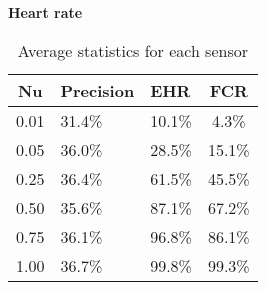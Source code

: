 \begin{table}[h]
  \vspace{4pt}

  \textbf{Heart rate}\vspace{2pt}
  \begin{tabularx}{\columnwidth}{cXXc}
    \toprule
    \textbf{Nu} & \textbf{Precision} & \textbf{EHR} & \textbf{FCR} \\
    \midrule
    0.01 & 31.4\% & 10.1\% & 4.3\% \\ \hline
    0.05 & 36.0\% & 28.5\% & 15.1\% \\ \hline
    0.25 & 36.4\% & 61.5\% & 45.5\% \\ \hline
    0.50 & 35.6\% & 87.1\% & 67.2\% \\ \hline
    0.75 & 36.1\% & 96.8\% & 86.1\% \\ \hline
    1.00 & 36.7\% & 99.8\% & 99.3\% \\ \hline
    \bottomrule
  \end{tabularx}

  \caption{Average statistics for each sensor}
  \label{[TABLE] avg_stats_sensors}
\end{table}